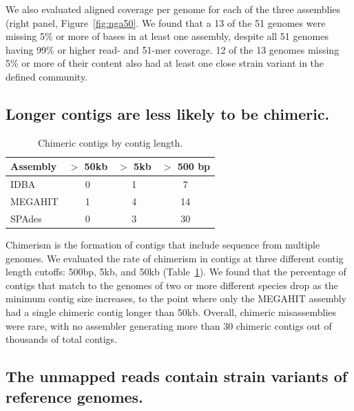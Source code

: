 \documentclass[11pt]{article}
\begin{document}
We also evaluated aligned coverage per genome for each of the three
assemblies (right panel, Figure~\ref{fig:nga50}.  We found that a 13
of the 51 genomes were missing 5\% or more of bases in at least one
assembly, despite all 51 genomes having 99\% or higher read- and
51-mer coverage.  12 of the 13 genomes missing 5\% or more of their
content also had at least one close strain variant in the defined
community.

\subsection*{Longer contigs are less likely to be chimeric.}

\begin{table}[!h]
\centering
\caption{Chimeric contigs by contig length.}
\begin{tabular}{|l|c|c|c|}\hline
\textbf{Assembly} & \textbf {$>$ 50kb} & \textbf {$>$ 5kb} & \textbf{$>$ 500 bp}
\\ \hline

IDBA         & 0 & 1 & 7 \\
MEGAHIT      & 1 & 4 & 14 \\ 
SPAdes       & 0 & 3 & 30 \\
\hline

\end{tabular}
\label{table:contig-chimera}

\end{table}

Chimerism is the formation of contigs that include sequence from
multiple genomes.  We evaluated the rate of chimerism in contigs at
three different contig length cutoffs: 500bp, 5kb, and 50kb
(Table~\ref{table:contig-chimera}).  We found that the percentage of
contigs that match to the genomes of two or more different species
drop as the minimum contig size increases, to the point where only the
MEGAHIT assembly had a single chimeric contig longer than 50kb.
Overall, chimeric misassemblies were rare, with no assembler
generating more than 30 chimeric contigs out of thousands of total
contigs.


\subsection*{The unmapped reads contain strain variants of reference genomes.}

\end{document}
